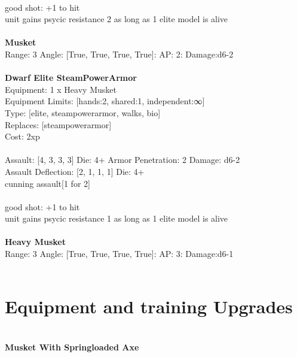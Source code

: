 \ \\
good shot: +1 to hit\\ 
unit gains psycic resistance 2 as long as 1 elite model is alive\\ 

\ \\
{\bf Musket } \\



Range: 3  Angle: [True, True, True, True]: AP: 2: Damage:d6-2 \\




 
\ \\

{\bf Dwarf Elite SteamPowerArmor } \\
Equipment: 1 x Heavy Musket \\
Equipment Limits: [hands:2, shared:1, independent:∞] \\
Type: [elite, steampowerarmor, walks, bio] \\
Replaces: [steampowerarmor] \\
Cost: 2xp\\
\ \\
Assault: [4, 3, 3, 3] Die: 4+ Armor Penetration: 2 Damage: d6-2 \\
Assault Deflection: [2, 1, 1, 1] Die: 4+\\
\indent cunning assault[1 for 2]\\ 
 
\ \\
good shot: +1 to hit\\ 
unit gains psycic resistance 1 as long as 1 elite model is alive\\ 

\ \\
{\bf Heavy Musket } \\



Range: 3  Angle: [True, True, True, True]: AP: 3: Damage:d6-1 \\




 
\ \\

\section{Equipment and training Upgrades}\ \\
{\bf Musket With Springloaded Axe } \\

